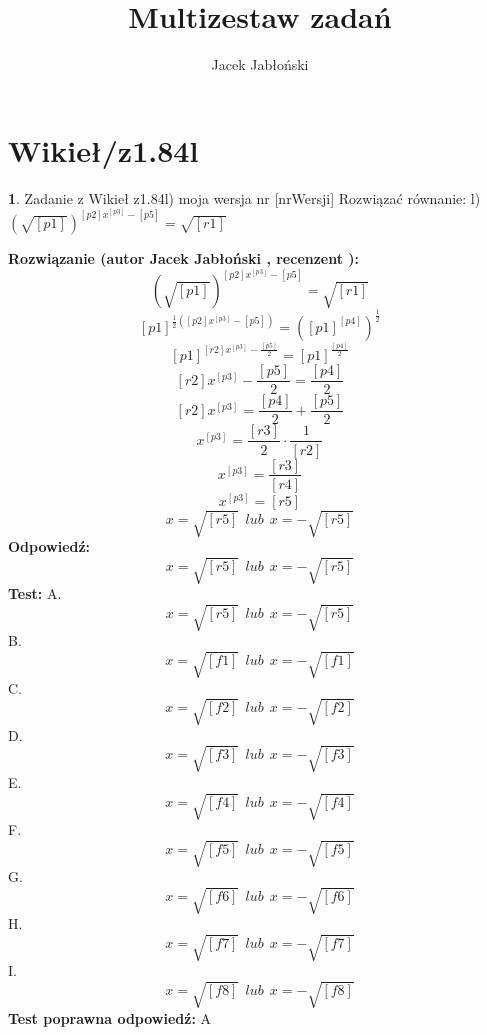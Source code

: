 \documentclass[12pt, a4paper]{article}
\title{Multizestaw zadań}
\author{Jacek Jabłoński}
\date{}
\theoremstyle{definition} %
\newtheorem{zad}{}
\newcommand{\kategoria}[1]{\section{#1}} %
\newcommand{\zadStart}[1]{\begin{zad}#1\newline} %
\newcommand{\zadStop}{\end{zad}}   %
\newcommand{\rozwStart}[2]{\noindent \textbf{Rozwiązanie (autor #1 , recenzent #2): }\newline} %
\newcommand{\rozwStop}{\newline}                                            %
\newcommand{\odpStart}{\noindent \textbf{Odpowiedź:}\newline}    %
\newcommand{\odpStop}{\newline}                                             %
\newcommand{\testStart}{\noindent \textbf{Test:}\newline} %
\newcommand{\testStop}{\newline} %
\newcommand{\kluczStart}{\noindent \textbf{Test poprawna odpowiedź:}\newline} %
\newcommand{\kluczStop}{\newline} %
\begin{document}
\maketitle


\kategoria{Wikieł/z1.84l}
\zadStart{Zadanie z Wikieł z1.84l) moja wersja nr [nrWersji]}
Rozwiązać równanie:
l) $(\sqrt{[p1]})^{[p2]x^{[p3]}-[p5]} = \sqrt{[r1]}$
\zadStop
\rozwStart{Jacek Jabłoński}{}
$$(\sqrt{[p1]})^{[p2]x^{[p3]}-[p5]} = \sqrt{[r1]}$$
$$[p1]^{\frac{1}{2}([p2]x^{[p3]}-[p5])} = ([p1]^{[p4]})^{\frac{1}{2}}$$
$$[p1]^{[r2]x^{[p3]}-\frac{[p5]}{2}} = [p1]^{\frac{[p4]}{2}}$$
$$[r2]x^{[p3]}-\frac{[p5]}{2} = \frac{[p4]}{2} $$
$$[r2]x^{[p3]} = \frac{[p4]}{2} + \frac{[p5]}{2} $$
$$x^{[p3]} = \frac{[r3]}{2} \cdot \frac{1}{[r2]}$$
$$x^{[p3]} =\frac{[r3]}{[r4]}$$
$$x^{[p3]} = [r5]$$
$$x=\sqrt{[r5]} \ \ lub \ \ x=-\sqrt{[r5]}$$
\rozwStop
\odpStart
$$x=\sqrt{[r5]} \ \ lub \ \ x=-\sqrt{[r5]}$$
\odpStop
\testStart
A. $$x=\sqrt{[r5]} \ \ lub \ \ x=-\sqrt{[r5]}$$
B. $$x=\sqrt{[f1]} \ \ lub \ \ x=-\sqrt{[f1]}$$
C. $$x=\sqrt{[f2]} \ \ lub \ \ x=-\sqrt{[f2]}$$
D. $$x=\sqrt{[f3]} \ \ lub \ \ x=-\sqrt{[f3]}$$
E. $$x=\sqrt{[f4]} \ \ lub \ \ x=-\sqrt{[f4]}$$
F. $$x=\sqrt{[f5]} \ \ lub \ \ x=-\sqrt{[f5]}$$
G. $$x=\sqrt{[f6]} \ \ lub \ \ x=-\sqrt{[f6]}$$
H. $$x=\sqrt{[f7]} \ \ lub \ \ x=-\sqrt{[f7]}$$
I. $$x=\sqrt{[f8]} \ \ lub \ \ x=-\sqrt{[f8]}$$
\testStop
\kluczStart
A
\kluczStop
\end{document}
